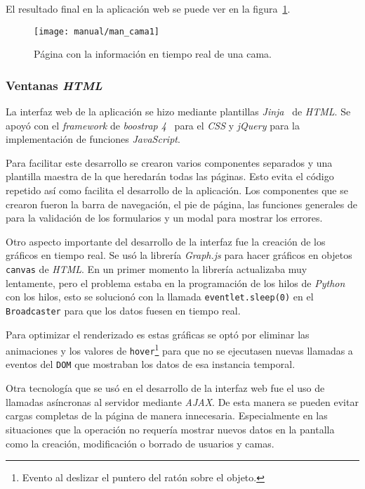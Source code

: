 El resultado final en la aplicación web se puede ver en la figura~\ref{fig:man_bed}.

\begin{figure}
	\centering
	\texttt{[image: manual/man\_cama1]}
	\caption{Página con la información en tiempo real de una cama.}
	\label{fig:man_bed}
\end{figure}


\subsubsection{Ventanas \textit{HTML}}

La interfaz web de la aplicación se hizo mediante plantillas \textit{Jinja}~\cite{tool:jinja} de \textit{HTML}. Se apoyó con el \textit{framework} de \textit{boostrap 4}~\cite{wiki:boostrap} para el \textit{CSS} y \textit{jQuery} para la implementación de funciones \textit{JavaScript}.

Para facilitar este desarrollo se crearon varios componentes separados y una plantilla maestra de la que heredarán todas las páginas. Esto evita el código repetido así como facilita el desarrollo de la aplicación. Los componentes que se crearon fueron la barra de navegación, el pie de página, las funciones generales de para la validación de los formularios y un modal para mostrar los errores.

Otro aspecto importante del desarrollo de la interfaz fue la creación de los gráficos en tiempo real. Se usó la librería \textit{Graph.js} para hacer gráficos en objetos \texttt{canvas} de \textit{HTML}. En un primer momento la librería actualizaba muy lentamente, pero el problema estaba en la programación de los hilos de \textit{Python} con los hilos, esto se solucionó con la llamada \texttt{eventlet.sleep(0)} en el \texttt{Broadcaster} para que los datos fuesen en tiempo real.

Para optimizar el renderizado es estas gráficas se optó por eliminar las animaciones y los valores de \texttt{hover}\footnote{Evento al deslizar el puntero del ratón sobre el objeto.} para que no se ejecutasen nuevas llamadas a eventos del \texttt{DOM} que mostraban los datos de esa instancia temporal.

Otra tecnología que se usó en el desarrollo de la interfaz web fue el uso de llamadas asíncronas al servidor mediante \textit{AJAX}. De esta manera se pueden evitar cargas completas de la página de manera innecesaria. Especialmente en las situaciones que la operación no requería mostrar nuevos datos en la pantalla como la creación, modificación o borrado de usuarios y camas. 

